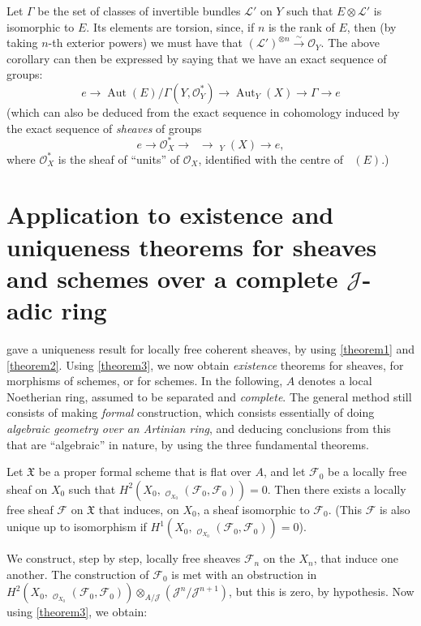 \documentclass{article}
\theoremstyle{plain}
\newenvironment{proposition}[1]
  {\renewcommand\theinnercustomproposition{#1}\innercustomproposition}
  {\endinnercustomproposition}
\theoremstyle{definition}
\newcommand{\sh}[1]{{\mathscr{#1}}}
\newcommand{\fk}{\mathfrak}
\DeclareMathOperator{\Hom}{Hom}
\DeclareMathOperator{\Aut}{Aut}
\DeclareMathOperator{\shHom}{\underline{\Hom}}
\DeclareMathOperator{\shAut}{\underline{\Aut}}
\newcommand{\oldpage}[1]{\marginpar{\footnotesize$\Big\vert$ \textit{p.~#1}}}
\begin{document}
Let $\Gamma$ be the set of classes of invertible bundles $\sh{L}'$ on $Y$ such that $E\otimes\sh{L}'$ is isomorphic to $E$.
Its elements are torsion, since, if $n$ is the rank of $E$, then (by taking $n$-th exterior powers) we must have that $(\sh{L}')^{\otimes n}\xrightarrow{\sim}\sh{O}_Y$.
The above corollary can then be expressed by saying that we have an exact sequence of groups:
\[
  e \to \Aut(E)/\Gamma(Y,\sh{O}_Y^*) \to \Aut_Y(X) \to \Gamma \to e
\]
(which can also be deduced from the exact sequence in cohomology induced by the exact sequence of \emph{sheaves} of groups
\oldpage{182-11}
\[
  e \to \sh{O}_X^* \to \shAut \to \shAut_Y(X) \to e,
\]
where $\sh{O}_X^*$ is the sheaf of ``units'' of $\sh{O}_X$, identified with the centre of $\shAut(E)$.)


\section{Application to existence and uniqueness theorems for sheaves and schemes over a complete $\mathscr{J}$-adic ring}
\label{section6}

 gave a uniqueness result for locally free coherent sheaves, by using \cref{theorem1} and \cref{theorem2}.
Using \cref{theorem3}, we now obtain \emph{existence} theorems for sheaves, for morphisms of schemes, or for schemes.
In the following, $A$ denotes a local Noetherian ring, assumed to be separated and \emph{complete}.
The general method still consists of making \emph{formal} construction, which consists essentially of doing \emph{algebraic geometry over an Artinian ring}, and deducing conclusions from this that are ``algebraic'' in nature, by using the three fundamental theorems.

\begin{proposition}{3}
\label{proposition3}
  Let $\fk{X}$ be a proper formal scheme that is flat over $A$, and let $\sh{F}_0$ be a locally free sheaf on $X_0$ such that $H^2(X_0,\shHom_{\sh{O}_{X_0}}(\sh{F}_0,\sh{F}_0))=0$.
  Then there exists a locally free sheaf $\sh{F}$ on $\fk{X}$ that induces, on $X_0$, a sheaf isomorphic to $\sh{F}_0$.
  (This $\sh{F}$ is also unique up to isomorphism if $H^1(X_0,\shHom_{\sh{O}_{X_0}}(\sh{F}_0,\sh{F}_0))=0$).
\end{proposition}

We construct, step by step, locally free sheaves $\sh{F}_n$ on the $X_n$, that induce one another.
The construction of $\sh{F}_0$ is met with an obstruction in $H^2(X_0,\shHom_{\sh{O}_{X_0}}(\sh{F}_0,\sh{F}_0))\otimes_{A/\sh{J}}(\sh{J}^n/\sh{J}^{n+1})$, but this is zero, by hypothesis.
Now using \cref{theorem3}, we obtain:
\end{document}
